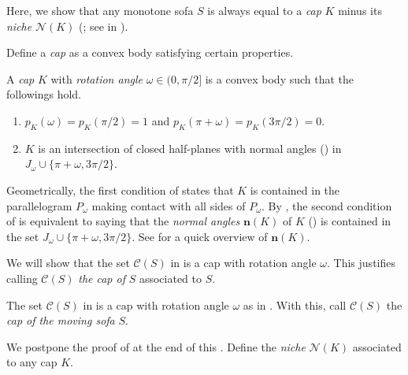 Here, we show that any monotone sofa \(S\) is always equal to a \emph{cap} \(K\) minus its \emph{niche} \(\mathcal{N}(K)\) (; see  in ).

Define a \emph{cap} as a convex body satisfying certain properties.

\begin{definition}

A \emph{cap} \(K\) with \emph{rotation angle} \(\omega \in (0, \pi/2]\) is a convex body such that the followings hold.

\begin{enumerate}
\def\labelenumi{\arabic{enumi}.}
\tightlist
\item
  \(p_K(\omega) = p_K(\pi/2) = 1\) and \(p_K(\pi + \omega) = p_K(3\pi/2) = 0\).
\item
  \(K\) is an intersection of closed half-planes with normal angles () in \(J_\omega \cup \{\pi + \omega, 3\pi/2\}\).
\end{enumerate}

\label{def:cap}
\end{definition}

Geometrically, the first condition of  states that \(K\) is contained in the parallelogram \(P_\omega\) making contact with all sides of \(P_\omega\). By , the second condition of  is equivalent to saying that the \emph{normal angles} \(\mathbf{n}(K)\) of \(K\) () is contained in the set \(J_\omega \cup \{\pi + \omega, 3\pi/2\}\). See  for a quick overview of \(\mathbf{n}(K)\).

We will show that the set \(\mathcal{C}(S)\) in  is a cap with rotation angle \(\omega\). This justifies calling \(\mathcal{C}(S)\) \emph{the cap of} \(S\) associated to \(S\).

\begin{theorem}

The set \(\mathcal{C}(S)\) in  is a cap with rotation angle \(\omega\) as in . With this, call \(\mathcal{C}(S)\) the \emph{cap of the moving sofa} \(S\).

\label{thm:cap-hallway-intersection}
\end{theorem}

We postpone the proof of  at the end of this . Define the \emph{niche} \(\mathcal{N}(K)\) associated to any cap \(K\).

